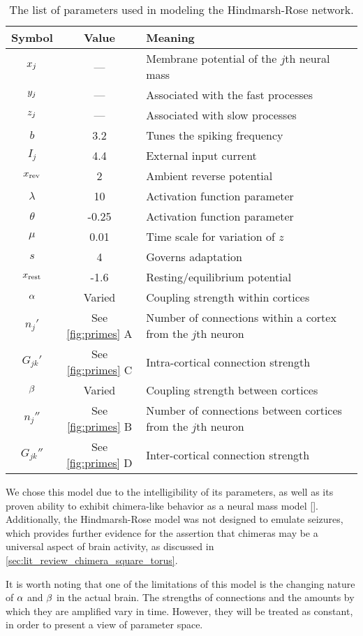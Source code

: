 \begin{table}[ht]
  \centering
  \begin{tabular}{c | c | p{}}
    Symbol & Value & Meaning \\ \hline
    $x_{j}$ & --- & Membrane potential of the $j$th neural mass \\
    $y_{j}$ & --- & Associated with the fast processes \\
    $z_{j}$ & --- & Associated with slow processes \\ \hline
    $b$ & 3.2 & Tunes the spiking frequency \\
    $I_{j}$ & 4.4 & External input current \\
    $x_{\text{rev}}$ & 2 & Ambient reverse potential \\
    $\lambda$ & 10 & Activation function parameter \\
    $\theta$ & -0.25 & Activation function parameter \\
    $\mu$ & 0.01 & Time scale for variation of $z$ \\
    $s$ & 4 & Governs adaptation \\
    $x_{\text{rest}}$ & -1.6 & Resting/equilibrium potential \\ \hline
    $\alpha$ & Varied & Coupling strength within cortices \\
    $n_{j}'$ & See \cref{fig:primes} A & Number of connections within a cortex from the $j$th neuron \\
    $G_{j k}'$ & See \cref{fig:primes} C & Intra-cortical connection strength \\
    $\beta$ & Varied & Coupling strength between cortices \\
    $n_{j}''$ & See \cref{fig:primes} B & Number of connections between cortices from the $j$th neuron \\
    $G_{j k}''$ & See \cref{fig:primes} D & Inter-cortical connection strength
  \end{tabular}
  \caption[Hindmarsh-Rose Parameters]{The list of parameters used in modeling the Hindmarsh-Rose network.}
  \label{tab:hr_params}
\end{table}

We chose this model due to the intelligibility of its parameters, as well as its proven ability to exhibit chimera-like behavior as a neural mass model [].
Additionally, the Hindmarsh-Rose model was not designed to emulate seizures, which provides further evidence for the assertion that chimeras may be a universal aspect of brain activity, as discussed in \cref{sec:lit_review_chimera_square_torus}.

It is worth noting that one of the limitations of this model is the changing nature of $\alpha$ and $\beta$ in the actual brain.
The strengths of connections and the amounts by which they are amplified vary in time.
However, they will be treated as constant, in order to present a view of parameter space.

